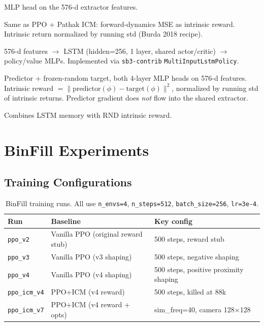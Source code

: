 \documentclass[11pt,letterpaper]{article}
\begin{document}
\begin{description}[leftmargin=2em]
  \item[PPO (vanilla)] MLP head on the 576-d extractor features.
  \item[PPO+ICM] Same as PPO + Pathak ICM: forward-dynamics MSE as intrinsic reward.
        Intrinsic return normalized by running std (Burda 2018 recipe).
  \item[RecurrentPPO (LSTM)] 576-d features $\to$ LSTM (hidden=256, 1 layer, shared
        actor/critic) $\to$ policy/value MLPs. Implemented via \texttt{sb3-contrib}
        \texttt{MultiInputLstmPolicy}.
  \item[RND] Predictor + frozen-random target, both 4-layer MLP heads on 576-d
        features. Intrinsic reward $= \|\text{predictor}(\phi) - \text{target}(\phi)\|^2$,
        normalized by running std of intrinsic returns. Predictor gradient does
        \emph{not} flow into the shared extractor.
  \item[RecurrentPPO+RND] Combines LSTM memory with RND intrinsic reward.
\end{description}

\section{BinFill Experiments}
\label{sec:binfill}

\subsection{Training Configurations}

\begin{table}[H]
\centering
\begin{tabular}{lll}
\toprule
\textbf{Run} & \textbf{Baseline} & \textbf{Key config} \\
\midrule
\texttt{ppo\_v2} & Vanilla PPO (original reward stub) & 500 steps, reward stub \\
\texttt{ppo\_v3} & Vanilla PPO (v3 shaping) & 500 steps, negative shaping \\
\texttt{ppo\_v4} & Vanilla PPO (v4 shaping) & 500 steps, positive proximity shaping \\
\texttt{ppo\_icm\_v4} & PPO+ICM (v4 reward) & 500 steps, killed at 88k \\
\texttt{ppo\_icm\_v7} & PPO+ICM (v4 reward + opts) & sim\_freq=40, camera 128×128 \\
\bottomrule
\end{tabular}
\caption{BinFill training runs. All use \texttt{n\_envs=4}, \texttt{n\_steps=512},
\texttt{batch\_size=256}, \texttt{lr=3e-4}.}
\end{table}
\end{document}
